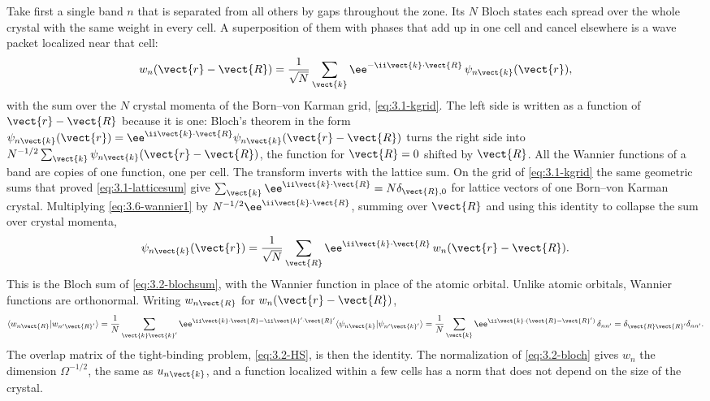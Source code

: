 Take first a single band $n$ that is separated from all others by gaps throughout the zone. Its $N$ Bloch states each spread over the whole crystal with the same weight in every cell. A superposition of them with phases that add up in one cell and cancel elsewhere is a wave packet localized near that cell:
\begin{equation}
  w_n(\vect{r} - \vect{R}) = \frac{1}{\sqrt N}\sum_{\vect{k}}\ee^{-\ii\vect{k}\cdot\vect{R}}\,\psi_{n\vect{k}}(\vect{r}) ,
  \label{eq:3.6-wannier1}
\end{equation}
with the sum over the $N$ crystal momenta of the Born--von Karman grid, \cref{eq:3.1-kgrid}. The left side is written as a function of $\vect{r} - \vect{R}$ because it is one: Bloch's theorem in the form $\psi_{n\vect{k}}(\vect{r}) = \ee^{\ii\vect{k}\cdot\vect{R}}\psi_{n\vect{k}}(\vect{r} - \vect{R})$ turns the right side into $N^{-1/2}\sum_{\vect{k}}\psi_{n\vect{k}}(\vect{r} - \vect{R})$, the function for $\vect{R} = 0$ shifted by $\vect{R}$. All the Wannier functions of a band are copies of one function, one per cell. The transform inverts with the lattice sum. On the grid of \cref{eq:3.1-kgrid} the same geometric sums that proved \cref{eq:3.1-latticesum} give $\sum_{\vect{k}}\ee^{\ii\vect{k}\cdot\vect{R}} = N\delta_{\vect{R},0}$ for lattice vectors of one Born--von Karman crystal. Multiplying \cref{eq:3.6-wannier1} by $N^{-1/2}\ee^{\ii\vect{k}\cdot\vect{R}}$, summing over $\vect{R}$ and using this identity to collapse the sum over crystal momenta,
\begin{equation}
  \psi_{n\vect{k}}(\vect{r}) = \frac{1}{\sqrt N}\sum_{\vect{R}}\ee^{\ii\vect{k}\cdot\vect{R}}\,w_n(\vect{r} - \vect{R}) .
  \label{eq:3.6-inverse}
\end{equation}
This is the Bloch sum of \cref{eq:3.2-blochsum}, with the Wannier function in place of the atomic orbital. Unlike atomic orbitals, Wannier functions are orthonormal. Writing $w_{n\vect{R}}$ for $w_n(\vect{r} - \vect{R})$,
\begin{equation*}
  \langle w_{n\vect{R}}|w_{n'\vect{R}'}\rangle = \frac1N\sum_{\vect{k}\vect{k}'}\ee^{\ii\vect{k}\cdot\vect{R} - \ii\vect{k}'\cdot\vect{R}'}\langle\psi_{n\vect{k}}|\psi_{n'\vect{k}'}\rangle
  = \frac1N\sum_{\vect{k}}\ee^{\ii\vect{k}\cdot(\vect{R} - \vect{R}')}\,\delta_{nn'} = \delta_{\vect{R}\vect{R}'}\delta_{nn'} .
\end{equation*} The overlap matrix of the tight-binding problem, \cref{eq:3.2-HS}, is then the identity. The normalization of \cref{eq:3.2-bloch} gives $w_n$ the dimension $\Omega^{-1/2}$, the same as $u_{n\vect{k}}$, and a function localized within a few cells has a norm that does not depend on the size of the crystal.

